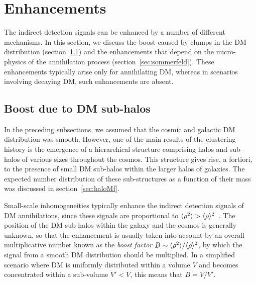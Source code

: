 \section{Enhancements}\label{sec:boost}

The indirect detection signals
can be enhanced by a number of 
different mechanisms. In this section, we discuss the boost caused by clumps in the DM distribution (section~\ref{sec:astroboost}) and the enhancements 
that depend on the micro-physics of the annihilation process (section~\ref{sec:sommerfeld}). 
These enhancements typically arise only for annihilating DM, whereas in scenarios involving decaying DM, such enhancements are absent.




\subsection{Boost due to DM sub-halos}\label{sec:astroboost}
In the preceding subsections, we assumed that the cosmic and galactic DM distribution was smooth. 
However, one of the main results of the clustering history is the emergence of a hierarchical structure 
comprising halos and sub-halos of various sizes throughout the cosmos. 
This structure gives rise, a fortiori,  to the presence of small DM sub-halos within the larger halos of galaxies.
The expected number distribution of these sub-structures as a function of their mass was discussed in section~\ref{sec:haloMf}. 


Small-scale inhomogeneities typically enhance the indirect detection signals of DM annihilations, 
since these signals are proportional to $\langle \rho^2\rangle>\langle \rho\rangle^2$~\cite{BoostFactorID}. 
The position of the DM sub-halos within the galaxy and the cosmos is generally unknown, so that the enhancement
is usually taken into account by an overall multiplicative number known as the {\em boost factor} $B \sim \langle \rho^2\rangle/\langle \rho\rangle^2$, by which the signal from a smooth DM distribution should be multiplied. 
In a simplified scenario where DM is uniformly distributed within a volume $V$ and becomes concentrated within a sub-volume $V' < V$, this means that 
$B = V/V'$.



